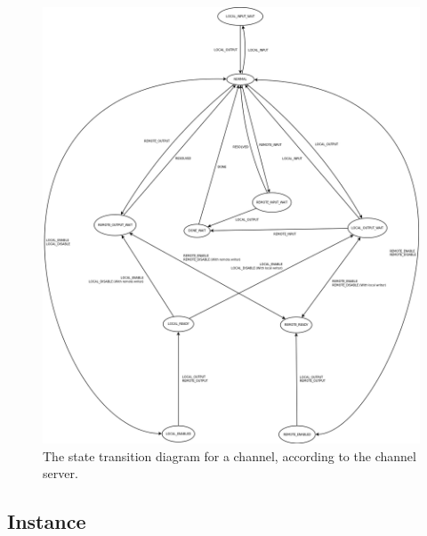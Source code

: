 \begin{figure}[H]
  \centering
  \includegraphics[width=\textwidth]{diagrams/channel_server}
  \caption{
    The state transition diagram for a channel, according to the channel
    server.
  }
  \label{channel-server}
\end{figure}

\subsection{Instance}

